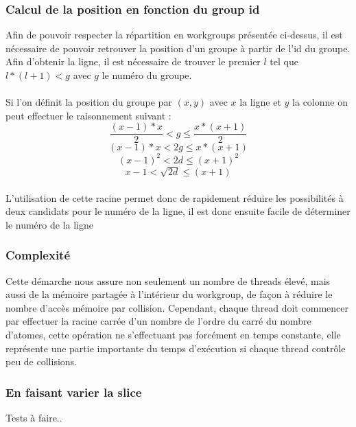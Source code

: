 \documentclass{article}
\begin{document}
\subsubsection{Calcul de la position en fonction du group id}
Afin de pouvoir respecter la répartition en workgroups présentée ci-dessus, il
est nécessaire de pouvoir retrouver la position d'un groupe à partir de l'id du
groupe. Afin d'obtenir la ligne, il est nécessaire de trouver le premier $l$ tel
que $l* (l+1) < g$ avec $g$ le numéro du groupe.
\paragraph{}
Si l'on définit la position du groupe par $(x,y)$ avec $x$ la ligne et $y$ la
colonne on peut effectuer le raisonnement suivant :
$$\frac{(x-1) * x}{2} < g \leq \frac{x * (x+1)}{2}$$
$$(x-1) * x < 2g \leq x * (x+1)$$
$$(x-1)^2 < 2d \leq (x+1)^2$$
$$x-1 < \sqrt{2d} \leq (x+1)$$
\paragraph{}
L'utilisation de cette racine permet donc de rapidement réduire les possibilités
à deux candidats pour le numéro de la ligne, il est donc ensuite facile de
déterminer le numéro de la ligne

\subsubsection{Complexité}
Cette démarche nous assure non seulement un nombre de threads élevé, mais aussi
de la mémoire partagée à l'intérieur du workgroup, de façon à réduire le nombre
d'accès mémoire par collision. Cependant, chaque thread doit commencer par
effectuer la racine carrée d'un nombre de l'ordre du carré du nombre d'atomes,
cette opération ne s'effectuant pas forcément en temps constante, elle
représente une partie importante du temps d'exécution si chaque thread contrôle
peu de collisions.
\subsubsection{En faisant varier la slice}
Tests à faire..
\end{document}
